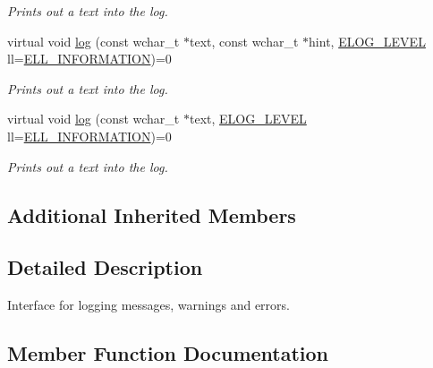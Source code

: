 \begin{DoxyCompactItemize}
\begin{DoxyCompactList}\small\item\em Prints out a text into the log. \end{DoxyCompactList}\item 
virtual void \hyperlink{classirr_1_1ILogger_aeef998619135d81205d2fd488d4a69b1}{log} (const wchar\+\_\+t $\ast$text, const wchar\+\_\+t $\ast$hint, \hyperlink{namespaceirr_aa2d1cac68606a25ed24cfffccfa30a92}{E\+L\+O\+G\+\_\+\+L\+E\+V\+EL} ll=\hyperlink{namespaceirr_aa2d1cac68606a25ed24cfffccfa30a92a9d74de15737e326a91aec6f38c23f9cf}{E\+L\+L\+\_\+\+I\+N\+F\+O\+R\+M\+A\+T\+I\+ON})=0
\begin{DoxyCompactList}\small\item\em Prints out a text into the log. \end{DoxyCompactList}\item 
virtual void \hyperlink{classirr_1_1ILogger_a40af57afdc28c5e890920cb448663ff9}{log} (const wchar\+\_\+t $\ast$text, \hyperlink{namespaceirr_aa2d1cac68606a25ed24cfffccfa30a92}{E\+L\+O\+G\+\_\+\+L\+E\+V\+EL} ll=\hyperlink{namespaceirr_aa2d1cac68606a25ed24cfffccfa30a92a9d74de15737e326a91aec6f38c23f9cf}{E\+L\+L\+\_\+\+I\+N\+F\+O\+R\+M\+A\+T\+I\+ON})=0
\begin{DoxyCompactList}\small\item\em Prints out a text into the log. \end{DoxyCompactList}\end{DoxyCompactItemize}
\subsection*{Additional Inherited Members}


\subsection{Detailed Description}
Interface for logging messages, warnings and errors. 

\subsection{Member Function Documentation}
\mbox{\label{classirr_1_1ILogger_acbbc214a06cd968409000f55aa76c82f}} 

